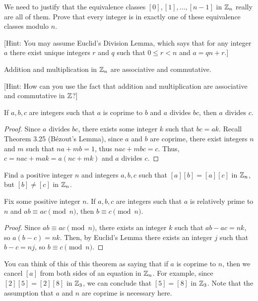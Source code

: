 \documentclass[../main.tex]{subfiles}
\begin{document}
\begin{exercise}
We need to justify that the equivalence classes $[0],[1],\dots,[n-1]$ in $\mathbb Z_n$ really are all of them. Prove that every integer is in exactly one of these equivalence classes modulo $n$.
\end{exercise}
[Hint: You may assume Euclid's Division Lemma, which says that for any integer $a$ there exist unique integers $r$ and $q$ such that $0 \leq r < n$ and $a=qn+r$.]

\begin{exercise}
Addition and multiplication in $\mathbb Z_n$ are associative and commutative.
\end{exercise}
[Hint: How can you use the fact that addition and multiplication are associative and commutative in $\mathbb Z$?]

\begin{theorem}
If $a,b,c$ are integers such that $a$ is coprime to $b$ and $a$ divides $bc$, then $a$ divides $c$.
\end{theorem}

\begin{proof}
Since $a$ divides $bc$, there exists some integer $k$ such that $bc=ak$. Recall Theorem 3.25 (Bézout's Lemma), since $a$ and $b$ are coprime, there exist integers $n$ and $m$ such that $na+mb=1$, thus $nac+mbc=c$. Thus, $c=nac+mak=a(nc+mk)$ and $a$ divides $c$.
\end{proof}

\begin{exercise}
Find a positive integer $n$ and integers $a,b,c$ such that $[a][b]=[a][c]$ in $\mathbb Z_n$, but $[b] \neq [c]$ in $\mathbb Z_n$.
\end{exercise}

\begin{theorem}
Fix some positive integer $n$. If $a,b,c$ are integers such that $a$ is relatively prime to $n$ and $ab \equiv ac \pmod{n}$, then $b \equiv c \pmod{n}$.
\end{theorem}

\begin{proof}
Since $ab \equiv ac \pmod{n}$, there exists an integer $k$ such that $ab-ac=nk$, so $a(b-c)=nk$. Then, by Euclid's Lemma there exists an integer $j$ such that $b-c=nj$, so $b \equiv c \pmod{n}$.
\end{proof}

You can think of this of this theorem as saying that if $a$ is coprime to $n$, then we cancel $[a]$ from both sides of an equation in $\mathbb Z_n$. For example, since $[2][5]=[2][8]$ in $\mathbb Z_3$, we can conclude that $[5]=[8]$ in $\mathbb Z_3$. Note that the assumption that $a$ and $n$ are coprime is necessary here.
\end{document}
